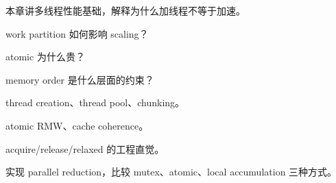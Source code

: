 {本章讲多线程性能基础，解释为什么加线程不等于加速。}
{\item work partition 如何影响 scaling？
\item atomic 为什么贵？
\item memory order 是什么层面的约束？}
{\item thread creation、thread pool、chunking。
\item atomic RMW、cache coherence。
\item acquire/release/relaxed 的工程直觉。}
{实现 parallel reduction，比较 mutex、atomic、local accumulation 三种方式。}
